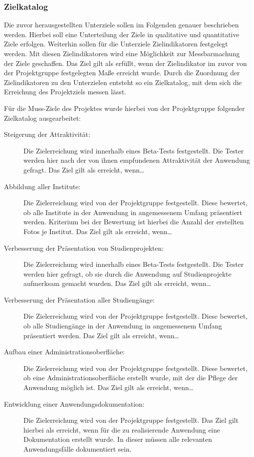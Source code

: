 \subsubsection{Zielkatalog}
\label{sec:Zielkatalog}

Die zuvor herausgestellten Unterziele sollen im Folgenden genauer beschrieben
werden. Hierbei soll eine Unterteilung der Ziele in qualitative und quantitative
Ziele erfolgen. Weiterhin sollen für die Unterziele Zielindikatoren festgelegt
werden. Mit diesen Zielindikatoren wird eine Möglichkeit zur Messbarmachung der
Ziele geschaffen. Das Ziel gilt als erfüllt, wenn der Zielindikator im zuvor von
der Projektgruppe festgelegten Maße erreicht wurde. Durch die Zuordnung der
Zielindikatoren zu den Unterzielen entsteht so ein Zielkatalog, mit dem sich
die Erreichung des Projektziels messen lässt.

Für die Muss-Ziele des Projektes wurde hierbei von der Projektgruppe folgender
Zielkatalog ausgearbeitet:



\begin{description}
	\item[Steigerung der Attraktivität:] Die Zielerreichung wird innerhalb eines
	Beta-Tests festgestellt. Die Tester werden hier nach der von ihnen empfundenen
	Attraktivität der Anwendung gefragt. Das Ziel gilt als erreicht, wenn\ldots
	
	\clearpage
	
	\item[Abbildung aller Institute:] Die Zielerreichung wird von der Projektgruppe
	festgestellt. Diese bewertet, ob alle Institute in der Anwendung in
	angemessenem Umfang präsentiert werden. Kriterium bei der Bewertung ist hierbei
	die Anzahl der erstellten Fotos je Institut. Das Ziel gilt als erreicht,
	wenn\ldots
	\item[Verbesserung der Präsentation von Studienprojekten:] Die Zielerreichung
	wird innerhalb eines Beta-Tests festgestellt. Die Tester werden hier gefragt,
	ob sie durch die Anwendung auf Studienprojekte aufmerksam gemacht wurden. Das
	Ziel gilt als erreicht, wenn\ldots
	\item[Verbesserung der Präsentation aller Studiengänge:] Die Zielerreichung
	wird von der Projektgruppe festgestellt. Diese bewertet, ob alle Studiengänge
	in der Anwendung in angemessenem Umfang präsentiert werden. Das Ziel gilt als
	erreicht, wenn\ldots
	\item[Aufbau einer Administrationsoberfläche:] Die Zielerreichung wird von der
	Projektgruppe festgestellt. Diese bewertet, ob eine Administrationsoberfläche
	erstellt wurde, mit der die Pflege der Anwendung möglich ist. Das Ziel gilt als
	erreicht, wenn\ldots
	\item[Entwicklung einer Anwendungsdokumentation:] Die Zielerreichung wird
	von der Projektgruppe festgestellt. Das Ziel gilt hierbei als erreicht, wenn
	für die zu realisierende Anwendung eine Dokumentation erstellt wurde. In dieser
	müssen alle relevanten Anwendungsfälle dokumentiert sein.
	\end{description}
	

